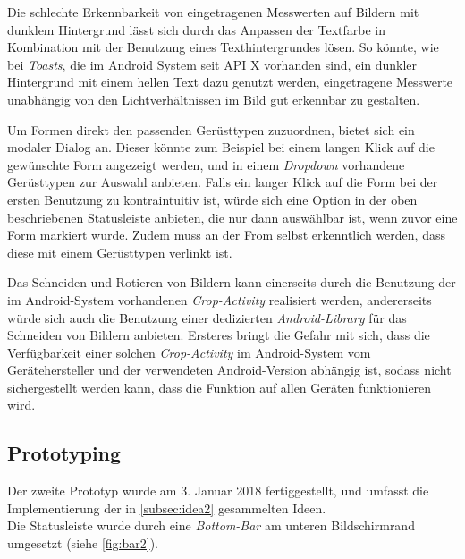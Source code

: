 Die schlechte Erkennbarkeit von eingetragenen Messwerten auf Bildern mit dunklem Hintergrund lässt sich durch das Anpassen der Textfarbe in Kombination mit der Benutzung eines Texthintergrundes lösen.
So könnte, wie bei \emph{Toasts}, die im Android System seit API X vorhanden sind, ein dunkler Hintergrund mit einem hellen Text dazu genutzt werden, eingetragene Messwerte unabhängig von den Lichtverhältnissen im Bild gut erkennbar zu gestalten. \\

Um Formen direkt den passenden Gerüsttypen zuzuordnen, bietet sich ein modaler Dialog an.
Dieser könnte zum Beispiel bei einem langen Klick auf die gewünschte Form angezeigt werden, und in einem \emph{Dropdown} vorhandene Gerüsttypen zur Auswahl anbieten.
Falls ein langer Klick auf die Form bei der ersten Benutzung zu kontraintuitiv ist, würde sich eine Option in der oben beschriebenen Statusleiste anbieten, die nur dann auswählbar ist, wenn zuvor eine Form markiert wurde.
Zudem muss an der From selbst erkenntlich werden, dass diese mit einem Gerüsttypen verlinkt ist. \\

Das Schneiden und Rotieren von Bildern kann einerseits durch die Benutzung der im Android-System vorhandenen \emph{Crop-Activity} realisiert werden, andererseits würde sich auch die Benutzung einer dedizierten \emph{Android-Library} für das Schneiden von Bildern anbieten.
Ersteres bringt die Gefahr mit sich, dass die Verfügbarkeit einer solchen \emph{Crop-Activity} im Android-System vom Gerätehersteller und der verwendeten Android-Version abhängig ist, sodass nicht sichergestellt werden kann, dass die Funktion auf allen Geräten funktionieren wird. \\

\subsection{Prototyping}

Der zweite Prototyp wurde am 3. Januar 2018 fertiggestellt, und umfasst die Implementierung der in \autoref{subsec:idea2} gesammelten Ideen. \\

Die Statusleiste wurde durch eine \emph{Bottom-Bar} am unteren Bildschirmrand umgesetzt (siehe \autoref{fig:bar2}).

